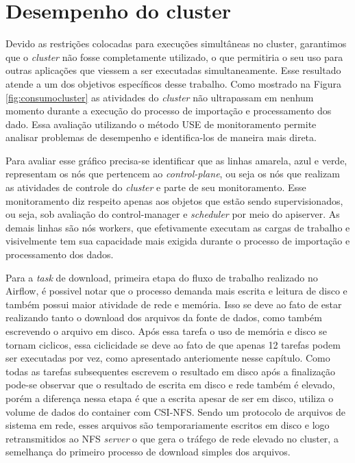 \section{Desempenho do cluster}
Devido as restrições colocadas para execuções simultâneas no cluster, garantimos que o \emph{cluster} não fosse completamente utilizado, o que permitiria o seu uso para outras aplicações que viessem a ser executadas simultaneamente. Esse resultado atende a um dos objetivos específicos desse trabalho. Como mostrado na Figura \ref{fig:consumocluster} as atividades do \emph{cluster} não ultrapassam em nenhum momento durante a execução do processo de importação e processamento dos dado. Essa avaliação utilizando o método USE de monitoramento permite analisar problemas de desempenho e identifica-los de maneira mais direta.

Para avaliar esse gráfico precisa-se identificar que as linhas amarela, azul e verde, representam os nós que pertencem ao \emph{control-plane}, ou seja os nós que realizam as atividades de controle do \emph{cluster} e parte de seu monitoramento. Esse monitoramento diz respeito apenas aos objetos que estão sendo supervisionados, ou seja, sob avaliação do control-manager e \emph{scheduler} por meio do apiserver. As demais linhas são nós workers, que efetivamente executam as cargas de trabalho e visivelmente tem sua capacidade mais exigida durante o processo de importação e processamento dos dados. 

Para a \emph{task} de download, primeira etapa do fluxo de trabalho realizado no Airflow, é possivel notar que o processo demanda mais escrita e leitura de disco e também possui maior atividade de rede e memória. Isso se deve ao fato de estar realizando tanto o download dos arquivos da fonte de dados, como também escrevendo o arquivo em disco. Após essa tarefa o uso de memória e disco se tornam ciclicos, essa ciclicidade se deve ao fato de que apenas 12 tarefas podem ser executadas por vez, como apresentado anteriomente nesse capítulo. Como todas as tarefas subsequentes escrevem o resultado em disco após a finalização pode-se observar que o resultado de escrita em disco e rede também é elevado, porém a diferença nessa etapa é que a escrita apesar de ser em disco, utiliza o volume de dados do container com CSI-NFS. Sendo um protocolo de arquivos de sistema em rede, esses arquivos são temporariamente escritos em disco e logo retransmitidos ao NFS \emph{server} o que gera o tráfego de rede elevado no cluster, a semelhança do primeiro processo de download simples dos arquivos. 

